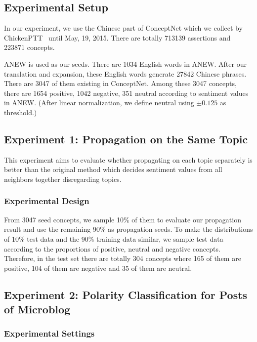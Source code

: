\subsection{Experimental Setup}
In our experiment, we use the Chinese part of ConceptNet which we collect by ChickenPTT~\cite{Kuo:HCOMP09} until May, 19, 2015. There are totally 713139 assertions and 223871 concepts. 

ANEW is used as our seeds. There are 1034 English words in ANEW. After our translation and expansion, these English words generate 27842 Chinese phrases. There are 3047 of them existing in ConceptNet. Among these 3047 concepts, there are 1654 positive, 1042 negative, 351 neutral according to sentiment values in ANEW. (After linear normalization, we define neutral using $\pm0.125$ as threshold.)

\subsection{Experiment 1: Propagation on the Same Topic}
This experiment aims to evaluate whether propagating on each topic separately is better than the original method which decides sentiment values from all neighbors together disregarding topics.

\subsubsection{Experimental Design}
From 3047 seed concepts, we sample 10\% of them to evaluate our propagation result and use the remaining 90\% as propagation seeds. To make the distributions of 10\% test data and the 90\% training data similar, we sample test data according to the proportions of positive, neutral and negative concepts. Therefore, in the test set there are totally 304 concepts where 165 of them are positive, 104 of them are negative and 35 of them are neutral.


\subsection{Experiment 2: Polarity Classification for Posts of Microblog}

\subsubsection{Experimental Settings}
